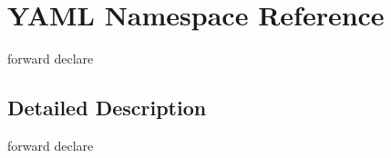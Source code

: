 \hypertarget{namespaceYAML}{}\section{Y\+A\+ML Namespace Reference}
\label{namespaceYAML}


forward declare  




\subsection{Detailed Description}
forward declare 